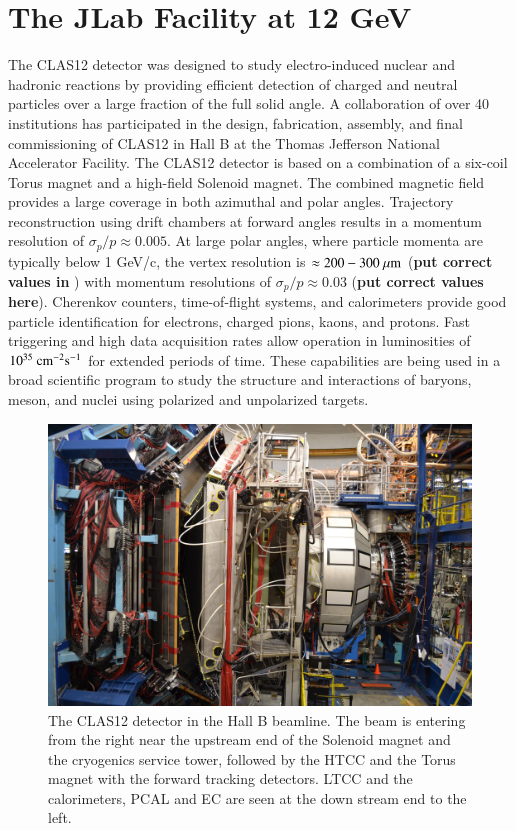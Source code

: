 \documentclass[final,3p,times,twocolumn,authoryear]{elsarticle}
\begin{document}
\section{The JLab Facility at 12 GeV}
 \label{jlab}
 The CLAS12 detector was designed to study electro-induced nuclear and hadronic reactions by providing efficient detection of charged and neutral particles over a large fraction of the full solid angle. A collaboration of over 40 institutions has participated in the design, fabrication, assembly, and final commissioning of CLAS12 in Hall B at the Thomas Jefferson  National Accelerator Facility. The CLAS12 detector is based on a combination of a six-coil Torus magnet and a high-field Solenoid magnet. The combined magnetic field provides a large coverage in both azimuthal and polar angles. Trajectory reconstruction using drift chambers at forward angles results in a momentum resolution of ${\sigma_p / p} \approx 0.005$. At large polar angles, where particle momenta are typically below 1 GeV/c, the vertex resolution is $\approx 200-300~\mu\rm{m}$ ({\bf put correct values in} ) with momentum resolutions of $\sigma_p / p \approx 0.03$  ({\bf put correct values here}).  Cherenkov counters, time-of-flight systems, and calorimeters provide good particle identification for electrons, charged pions, kaons, and protons. Fast triggering and high data acquisition rates allow operation in luminosities of $10^{35}~\rm{cm}^{-2}\rm{s}^{-1}$ for extended periods of time. These capabilities are being used in a broad scientific program to study the structure and interactions of baryons, meson, and nuclei using polarized and unpolarized targets. 

\begin{figure}[bhtp!]
\centerline{\includegraphics[width=1.4\columnwidth]{CLAS12_photo-1.jpg}}
\caption{\footnotesize The CLAS12 detector in the Hall B beamline. The beam is entering from the right near the upstream end of the Solenoid magnet and 
the cryogenics service tower, followed by the HTCC and the Torus magnet with the forward tracking detectors.  LTCC and the calorimeters, PCAL and EC are seen at the down stream end to the left.  
}
\label{clas12-photo}
\end{figure}
\end{document}
